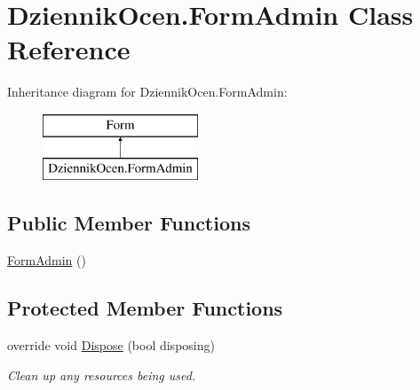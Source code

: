 \hypertarget{class_dziennik_ocen_1_1_form_admin}{}\section{Dziennik\+Ocen.\+Form\+Admin Class Reference}
\label{class_dziennik_ocen_1_1_form_admin}
Inheritance diagram for Dziennik\+Ocen.\+Form\+Admin\+:\begin{figure}[H]
\begin{center}
\leavevmode
\includegraphics[height=2.000000cm]{class_dziennik_ocen_1_1_form_admin}
\end{center}
\end{figure}
\subsection*{Public Member Functions}
\begin{DoxyCompactItemize}
\item 
\hyperlink{class_dziennik_ocen_1_1_form_admin_a56c723984192ed6599a2f426a7b03b56}{Form\+Admin} ()
\end{DoxyCompactItemize}
\subsection*{Protected Member Functions}
\begin{DoxyCompactItemize}
\item 
override void \hyperlink{class_dziennik_ocen_1_1_form_admin_a226138ac8da3cb8b2064e61823c13a3a}{Dispose} (bool disposing)
\begin{DoxyCompactList}\small\item\em Clean up any resources being used. \end{DoxyCompactList}\end{DoxyCompactItemize}
